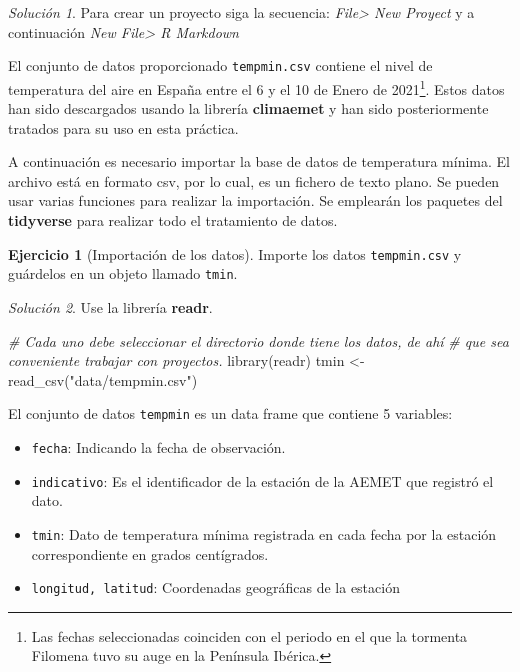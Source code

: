 \documentclass[
]{book}
\newenvironment{Shaded}{\begin{snugshade}}{\end{snugshade}}
\newcommand{\CommentTok}[1]{\textcolor[rgb]{0.56,0.35,0.01}{\textit{#1}}}
\newcommand{\FunctionTok}[1]{\textcolor[rgb]{0.00,0.00,0.00}{#1}}
\newcommand{\NormalTok}[1]{#1}
\newcommand{\OtherTok}[1]{\textcolor[rgb]{0.56,0.35,0.01}{#1}}
\newcommand{\StringTok}[1]{\textcolor[rgb]{0.31,0.60,0.02}{#1}}
\theoremstyle{definition}
\theoremstyle{definition}
\theoremstyle{definition}
\newtheorem{exercise}{Ejercicio}[chapter]
\theoremstyle{definition}
\theoremstyle{remark}
\newtheorem*{solution}{Solución}
\begin{document}
\begin{solution}
Para crear un proyecto siga la secuencia: \emph{File\textgreater{} New Proyect} y a continuación
\emph{New File\textgreater{} R Markdown}
\end{solution}

El conjunto de datos proporcionado \texttt{tempmin.csv} contiene el nivel de
temperatura del aire en España entre el 6 y el 10 de Enero de
2021\footnote{Las fechas seleccionadas coinciden con el periodo en el
  que la tormenta Filomena tuvo su auge en la Península Ibérica.}. Estos datos han sido descargados usando la librería
\textbf{climaemet} \citep{R-climaemet} y han sido posteriormente tratados para su uso en
esta práctica.

A continuación es necesario importar la base de datos de temperatura mínima. El
archivo está en formato csv, por lo cual, es un fichero de texto plano. Se
pueden usar varias funciones para realizar la importación. Se emplearán los
paquetes del \textbf{tidyverse} \citep{R-tidyverse} para realizar todo el tratamiento de
datos.

\begin{exercise}[Importación de los datos]
\protect\hypertarget{exr:ex2}{}\label{exr:ex2}Importe los datos \texttt{tempmin.csv} y guárdelos en un objeto llamado \texttt{tmin}.
\end{exercise}

\begin{solution}
Use la librería \textbf{readr}.
\end{solution}

\begin{Shaded}
\begin{Highlighting}[]
\CommentTok{\# Cada uno debe seleccionar el directorio donde tiene los datos, de ahí}
\CommentTok{\# que sea conveniente trabajar con proyectos.}
\FunctionTok{library}\NormalTok{(readr)}
\NormalTok{tmin }\OtherTok{\textless{}{-}} \FunctionTok{read\_csv}\NormalTok{(}\StringTok{"data/tempmin.csv"}\NormalTok{)}
\end{Highlighting}
\end{Shaded}

El conjunto de datos \texttt{tempmin} es un data frame que contiene 5 variables:

\begin{itemize}
\item
  \texttt{fecha}: Indicando la fecha de observación.
\item
  \texttt{indicativo}: Es el identificador de la estación de la AEMET que registró el
  dato.
\item
  \texttt{tmin}: Dato de temperatura mínima registrada en cada fecha por la estación
  correspondiente en grados centígrados.
\item
  \texttt{longitud,\ latitud}: Coordenadas geográficas de la estación
\end{itemize}
\end{document}
